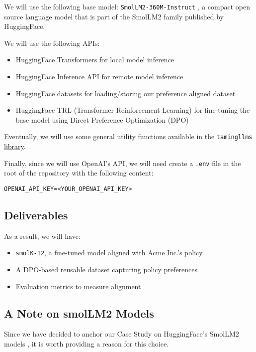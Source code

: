 We will use the following base model: \texttt{SmolLM2-360M-Instruct} , a compact open source language model that is part of the SmolLM2 family published by HuggingFace.

We will use the following APIs:

\begin{itemize}
\item HuggingFace Transformers for local model inference
\item HuggingFace Inference API for remote model inference
\item HuggingFace datasets for loading/storing our preference aligned dataset
\item HuggingFace TRL (Transformer Reinforcement Learning) for fine-tuning the base model using Direct Preference Optimization (DPO)
\end{itemize}

Eventually, we will use some general utility functions available in the \texttt{tamingllms} \href{https://github.com/souzatharsis/tamingLLMs/blob/master/tamingllms/notebooks/taming_utils.py}{library}.

Finally, since we will use OpenAI's API, we will need create a \texttt{.env} file in the root of the repository with the following content:

\begin{verbatim}
OPENAI_API_KEY=<YOUR_OPENAI_API_KEY>
\end{verbatim}

\subsection{Deliverables}

As a result, we will have:

\begin{itemize}
\item \texttt{smolK-12}, a fine-tuned model aligned with Acme Inc.'s policy 
\item A DPO-based reusable dataset capturing policy preferences
\item Evaluation metrics to measure alignment
\end{itemize}

\subsection{A Note on smolLM2 Models}

Since we have decided to anchor our Case Study on HuggingFace's SmolLM2 models , it is worth providing a reason for this choice.

